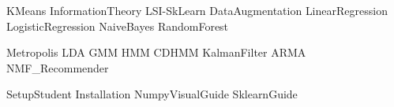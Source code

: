 \documentclass[opener-c,labs,yellow,nociteref]{HJnewsiambook}
\begin{document}
{KMeans}
{InformationTheory}
{LSI-SkLearn}
{DataAugmentation}
{LinearRegression}
{LogisticRegression}
{NaiveBayes}
{RandomForest}

{Metropolis}
{LDA}
{GMM}
{HMM}
{CDHMM}
{KalmanFilter}
{ARMA}
{NMF_Recommender}



\begin{appendices}
{SetupStudent}
{Installation}
{NumpyVisualGuide}
{SklearnGuide}
\end{appendices}



\end{document}
